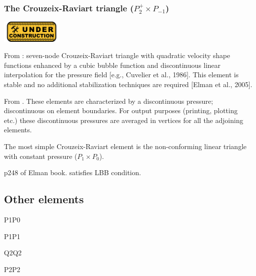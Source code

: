 \subsubsection{The Crouzeix-Raviart triangle ($P_2^+\times P_{-1}$)}
\includegraphics[width=3cm]{images/under_construction}

From \cite{daks08}: seven-node Crouzeix-Raviart triangle with quadratic velocity shape functions enhanced by a cubic bubble function and discontinuous linear interpolation for the pressure field [e.g., Cuvelier et al., 1986]. This element is stable and no additional stabilization techniques are required [Elman et al., 2005].

From \cite{segal}. These elements are characterized by a discontinuous pressure; 
discontinuous on element boundaries. 
For output purposes (printing, plotting etc.) these discontinuous pressures are averaged 
in vertices for all the adjoining elements.

The most simple Crouzeix-Raviart element is the non-conforming linear triangle 
with constant pressure ($P_1\times P_0$).

p248 of Elman book. satisfies LBB condition. 

\subsection{Other elements}

P1P0

P1P1

Q2Q2

P2P2

